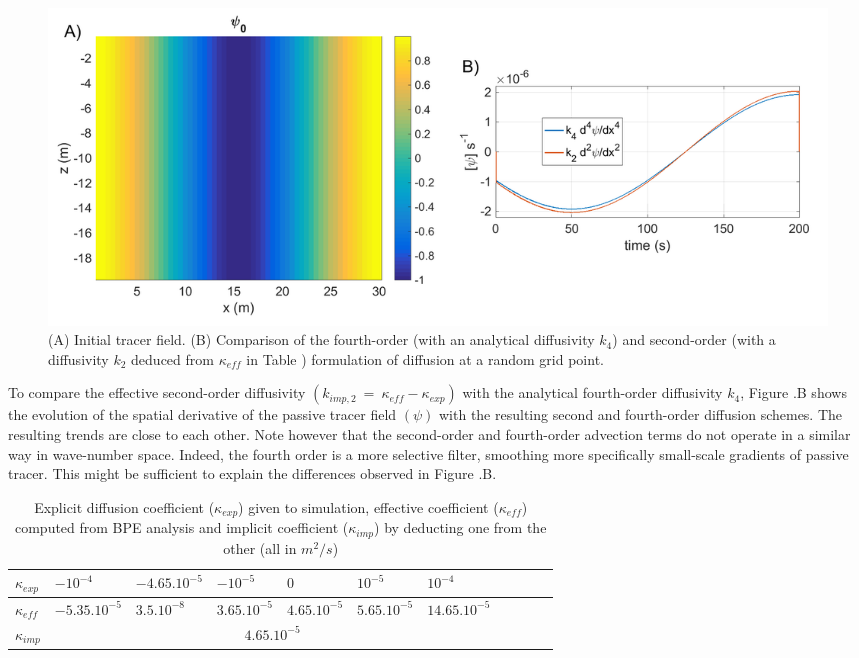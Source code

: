 \begin{figure}[h!]
\centering
\includegraphics[width=1\textwidth]{./CHAP_BPE/AGBPE_numlab5.png}
\caption[Initial field and comparison of coefficient $k_2$ and $k_4$ for configuration $BPE_{imp}$ with RK3-UP3 schemes]{(A) Initial tracer field. (B) Comparison of the fourth-order (with an analytical diffusivity $k_4$) and second-order (with a diffusivity $k_2$ deduced from $\kappa_{eff}$ in Table ) formulation of diffusion at a random grid point.}
\label{fig5numlab}
\end{figure}

To compare the effective second-order diffusivity $(k_{imp,2}\ =\ \kappa_{eff}-\kappa_{exp})$ with the analytical fourth-order diffusivity $k_4$, Figure .B shows the evolution of the spatial derivative of the passive tracer field $(\psi)$ with the resulting second and fourth-order diffusion schemes. The resulting trends are close to each other.
Note however that the second-order and fourth-order advection terms do not operate in a similar way in wave-number space. Indeed, the fourth order is a more selective filter, smoothing more specifically small-scale gradients of passive tracer. This might be sufficient to explain the differences observed in Figure .B.

\begin{table}[h!]
\centering
\begin{tabular}{|l|l|l|l|l|l|l|l|l|l|l|}
\hline
$\kappa_{exp}$ & $-10^{-4}$ &$-4.65.10^{-5}$ & $-10^{-5}$& $0$& $10^{-5}$& $10^{-4}$\\
\hline
$\kappa_{eff}$ & $-5.35.10^{-5}$ &$3.5.10^{-8}$ & $3.65.10^{-5}$& $4.65.10^{-5}$& $5.65.10^{-5}$& $14.65.10^{-5}$\\
\hline
$\kappa_{imp}$&\multicolumn{6}{c|}{$4.65.10^{-5}$}\\
\hline
\end{tabular}
\caption{Explicit diffusion coefficient ($\kappa_{exp}$) given to simulation, effective coefficient ($\kappa_{eff}$) computed from BPE analysis and implicit coefficient ($\kappa_{imp}$) by deducting one from the other (all in $m^2/s$)}
\label{table_kappa}
\end{table}

